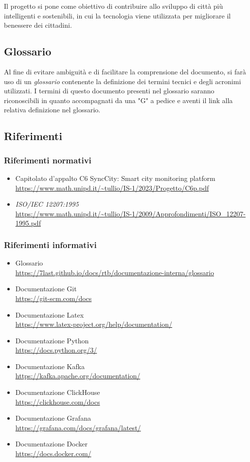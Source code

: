 Il progetto si pone come obiettivo di contribuire allo sviluppo di città più intelligenti e sostenibili, in cui la tecnologia viene utilizzata per migliorare il benessere dei cittadini.

\subsection{Glossario}
Al fine di evitare ambiguità e di facilitare la comprensione del documento, si farà uso di un \textit{glossario} contenente la definizione dei termini tecnici e degli acronimi utilizzati. I termini di questo documento presenti nel glossario saranno riconoscibili in quanto accompagnati da una "G" a pedice e aventi il link alla relativa definizione nel glossario.

\subsection{Riferimenti}
\subsubsection{Riferimenti normativi}
\begin{itemize}
	\item Capitolato d'appalto C6 SyncCity: Smart city monitoring platform \\ \url{https://www.math.unipd.it/~tullio/IS-1/2023/Progetto/C6p.pdf}
	\item \textit{ISO/IEC 12207:1995} \\ \url{https://www.math.unipd.it/~tullio/IS-1/2009/Approfondimenti/ISO_12207-1995.pdf}
	
\end{itemize}
\subsubsection{Riferimenti informativi}
\begin{itemize}
    \item Glossario\\ \url{https://7last.github.io/docs/rtb/documentazione-interna/glossario}
    \item Documentazione Git\\ \url{https://git-scm.com/docs}
    \item Documentazione Latex\\ \url{https://www.latex-project.org/help/documentation/}
    \item Documentazione Python\\ \url{https://docs.python.org/3/}
    \item Documentazione Kafka\\ \url{https://kafka.apache.org/documentation/}
    \item Documentazione ClickHouse\\ \url{https://clickhouse.com/docs}
    \item Documentazione Grafana\\ \url{https://grafana.com/docs/grafana/latest/}
    \item Documentazione Docker\\ \url{https://docs.docker.com/}
\end{itemize}